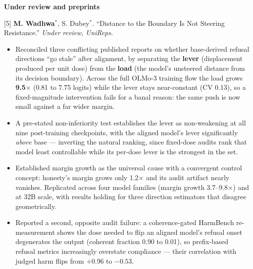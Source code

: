 \documentclass[letterpaper,10pt]{article}
\begin{document}
\vspace{4pt}
\textbf{\small Under review and preprints}
\vspace{2pt}

\small{[5] \textbf{M. Wadhwa}$^{*}$, S. Dubey$^{*}$. ``Distance to the Boundary Is Not Steering Resistance.'' \textit{Under review, UniReps.}}
\begin{itemize}[leftmargin=0.3in, itemsep=1pt, topsep=2pt, parsep=0pt]
  \item \small Reconciled three conflicting published reports on whether base-derived refusal directions ``go stale'' after alignment, by separating the \textbf{lever} (displacement produced per unit dose) from the \textbf{load} (the model's unsteered distance from its decision boundary). Across the full OLMo-3 training flow the load grows \textbf{9.5$\times$} (0.81 to 7.75 logits) while the lever stays near-constant (CV 0.13), so a fixed-magnitude intervention fails for a banal reason: the same push is now small against a far wider margin.
  \item \small A pre-stated non-inferiority test establishes the lever as non-weakening at all nine post-training checkpoints, with the aligned model's lever significantly \emph{above} base --- inverting the natural ranking, since fixed-dose audits rank that model least controllable while its per-dose lever is the strongest in the set.
  \item \small Established margin growth as the universal cause with a convergent control concept: honesty's margin grows only 1.2$\times$ and its audit artifact nearly vanishes. Replicated across four model families (margin growth 3.7--9.8$\times$) and at 32B scale, with results holding for three direction estimators that disagree geometrically.
  \item \small Reported a second, opposite audit failure: a coherence-gated HarmBench re-measurement shows the dose needed to flip an aligned model's refusal onset degenerates the output (coherent fraction 0.90 to 0.01), so prefix-based refusal metrics increasingly overstate compliance --- their correlation with judged harm flips from $+0.96$ to $-0.53$.
\end{itemize}
\end{document}
